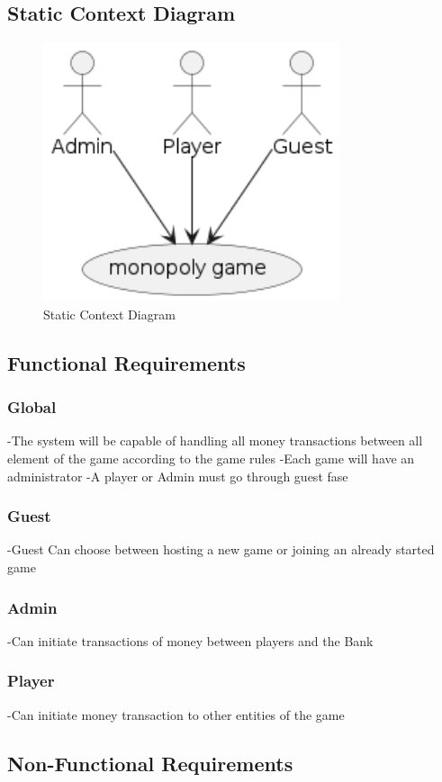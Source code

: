 \documentclass{article}
\begin{document}
\subsection{Static Context Diagram}
 \begin{figure}[H]
	 \centering
	 \includegraphics[height=3in]{../thesis_tex/assets/diagrams/SCD.png}
	 \caption{Static Context Diagram}
\end{figure}

\subsection{Functional Requirements}
\subsubsection{Global}
-The system will be capable of handling all money transactions between all element of the game according to the game rules
-Each game will have an administrator
-A player or Admin must go through guest fase
\subsubsection{Guest}
-Guest Can choose between hosting a new game or joining an already started game
\subsubsection{Admin}
-Can initiate transactions of money between players and the Bank
\subsubsection{Player}
-Can initiate money transaction to other entities of the game

\subsection{Non-Functional Requirements}
\end{document}
